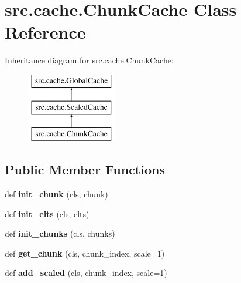\hypertarget{classsrc_1_1cache_1_1_chunk_cache}{}\section{src.\+cache.\+Chunk\+Cache Class Reference}
\label{classsrc_1_1cache_1_1_chunk_cache}
Inheritance diagram for src.\+cache.\+Chunk\+Cache\+:\begin{figure}[H]
\begin{center}
\leavevmode
\includegraphics[height=3.000000cm]{classsrc_1_1cache_1_1_chunk_cache}
\end{center}
\end{figure}
\subsection*{Public Member Functions}
\begin{DoxyCompactItemize}
\item 
\hypertarget{classsrc_1_1cache_1_1_chunk_cache_a85a1923cf44e54de9d47758b98fd9291}{}\label{classsrc_1_1cache_1_1_chunk_cache_a85a1923cf44e54de9d47758b98fd9291} 
def {\bfseries init\+\_\+chunk} (cls, chunk)
\item 
\hypertarget{classsrc_1_1cache_1_1_chunk_cache_a4b9c278db8f67e319aaf8f71dad7d44e}{}\label{classsrc_1_1cache_1_1_chunk_cache_a4b9c278db8f67e319aaf8f71dad7d44e} 
def {\bfseries init\+\_\+elts} (cls, elts)
\item 
\hypertarget{classsrc_1_1cache_1_1_chunk_cache_a9362039369a1f9d98e948d2ba52451fc}{}\label{classsrc_1_1cache_1_1_chunk_cache_a9362039369a1f9d98e948d2ba52451fc} 
def {\bfseries init\+\_\+chunks} (cls, chunks)
\item 
\hypertarget{classsrc_1_1cache_1_1_chunk_cache_a66835db74eeb924cd122c593cb76dc05}{}\label{classsrc_1_1cache_1_1_chunk_cache_a66835db74eeb924cd122c593cb76dc05} 
def {\bfseries get\+\_\+chunk} (cls, chunk\+\_\+index, scale=1)
\item 
\hypertarget{classsrc_1_1cache_1_1_chunk_cache_a6d4479abf37889e7a6a8255f9d0f2e11}{}\label{classsrc_1_1cache_1_1_chunk_cache_a6d4479abf37889e7a6a8255f9d0f2e11} 
def {\bfseries add\+\_\+scaled} (cls, chunk\+\_\+index, scale=1)
\end{DoxyCompactItemize}
